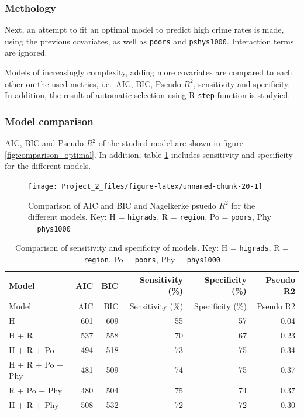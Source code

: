 \documentclass[a4paper]{article}
\begin{document}
\hypertarget{methology}{%
\subsubsection{Methology}\label{methology}}

Next, an attempt to fit an optimal model to predict high crime rates is
made, using the previous covariates, as well as \texttt{poors} and
\texttt{pshys1000}. Interaction terms are ignored.

Models of increasingly complexity, adding more covariates are compared
to each other on the used metrics, i.e.~AIC, BIC, Pseudo \(R^2\),
sensitivity and specificity. In addition, the result of automatic
selection using R \texttt{step} function is studyied.

\hypertarget{model-comparison-1}{%
\subsubsection{Model comparison}\label{model-comparison-1}}

AIC, BIC and Pseudo \(R^2\) of the studied model are shown in figure
\ref{fig:comparison_optimal}. In addition, table
\ref{tab:comparison_optimal} includes sensitivity and specificity for
the different models.

\begin{figure}[h]
\texttt{[image: Project\_2\_files/figure-latex/unnamed-chunk-20-1]} \caption{\label{fig:comparison_optimal}Comparison of AIC and BIC and Nagelkerke psuedo $R^2$ for the different models. Key: H = \texttt{higrads}, R = \texttt{region}, Po = \texttt{poors}, Phy = \texttt{phys1000}}\label{fig:unnamed-chunk-20}
\end{figure}

\begin{longtable}[]{@{}lrrrrr@{}}
\caption{\label{tab:comparison_optimal}Comparison of sensitivity and
specificity of models. Key: H = \texttt{higrads}, R = \texttt{region},
Po = \texttt{poors}, Phy = \texttt{phys1000}}\tabularnewline
\toprule
Model & AIC & BIC & Sensitivity (\%) & Specificity (\%) & Pseudo
R2\tabularnewline
\midrule
\endfirsthead
\toprule
Model & AIC & BIC & Sensitivity (\%) & Specificity (\%) & Pseudo
R2\tabularnewline
\midrule
\endhead
H & 601 & 609 & 55 & 57 & 0.04\tabularnewline
H + R & 537 & 558 & 70 & 67 & 0.23\tabularnewline
H + R + Po & 494 & 518 & 73 & 75 & 0.34\tabularnewline
H + R + Po + Phy & 481 & 509 & 74 & 75 & 0.37\tabularnewline
R + Po + Phy & 480 & 504 & 75 & 74 & 0.37\tabularnewline
H + R + Phy & 508 & 532 & 72 & 72 & 0.30\tabularnewline
\bottomrule
\end{longtable}
\end{document}
